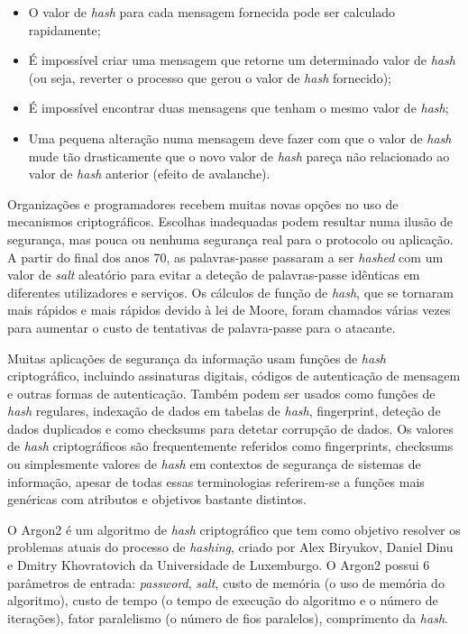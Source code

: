 \documentclass[conference]{IEEEtran}
\begin{document}
\begin{itemize}
\item O valor de \textit{hash} para cada mensagem fornecida pode ser calculado rapidamente;
\item É impossível criar uma mensagem que retorne um determinado valor de \textit{hash} (ou seja, reverter o processo 
que gerou o valor de \textit{hash} fornecido);
\item É impossível encontrar duas mensagens que tenham o mesmo valor de \textit{hash};
\item Uma pequena alteração numa mensagem deve fazer com que o valor de \textit{hash} mude tão drasticamente 
que o novo valor de \textit{hash} pareça não relacionado ao valor de \textit{hash} anterior (efeito de avalanche).
\end{itemize} \cite{al2011cryptographic}

Organizações e programadores recebem muitas novas opções no uso de mecanismos criptográficos. 
Escolhas inadequadas podem resultar numa ilusão de segurança, mas pouca ou nenhuma segurança 
real para o protocolo ou aplicação.
A partir do final dos anos 70, as 
palavras-passe passaram a ser \textit{hashed} com um valor de \textit{salt} aleatório para evitar a 
deteção de palavras-passe idênticas em diferentes utilizadores e serviços. Os 
cálculos de função de \textit{hash}, que se tornaram mais rápidos e mais rápidos 
devido à lei de Moore, foram chamados várias vezes para aumentar o custo 
de tentativas de palavra-passe para o atacante. \cite{argon2spec}

Muitas aplicações de segurança da informação usam funções de \textit{hash} criptográfico, incluindo 
assinaturas digitais, códigos de autenticação de mensagem e outras formas de autenticação. 
Também podem ser usados como funções de \textit{hash} regulares, indexação de dados em tabelas de \textit{hash}, 
fingerprint, deteção de dados duplicados e como 
checksums para detetar corrupção de dados. Os valores de \textit{hash} criptográficos são frequentemente 
referidos como fingerprints, checksums ou simplesmente valores de \textit{hash} em contextos de 
segurança de sistemas de informação, apesar de todas essas terminologias referirem-se a funções mais 
genéricas com atributos e objetivos bastante distintos. \cite{hashwiki}

O Argon2 é um algoritmo de \textit{hash} criptográfico que tem como objetivo resolver 
os problemas atuais do processo de \textit{hashing}, criado por Alex Biryukov, 
Daniel Dinu e Dmitry Khovratovich da Universidade de Luxemburgo. O Argon2 
possui 6 parâmetros de entrada: \textit{password}, \textit{salt}, custo de memória (o uso de 
memória do algoritmo), custo de tempo (o tempo de execução do algoritmo e o 
número de iterações), fator paralelismo (o número de fios paralelos), 
comprimento da \textit{hash}.
\end{document}
